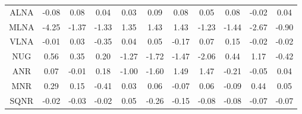 \documentclass[11pt,a4paper]{report}
\begin{document}
\begin{longtable}{ | c || c | c | c | c | c | c | c | c | c || c |}
ALNA &  \cellcolor[HTML]{FFFFFF} -0.08 &  \cellcolor[HTML]{FFFFFF} 0.08 &  \cellcolor[HTML]{FFFFFF} 0.04 &  \cellcolor[HTML]{FFFFFF} 0.03 &  \cellcolor[HTML]{FFFFFF} 0.09 &  \cellcolor[HTML]{FFFFFF} 0.08 &  \cellcolor[HTML]{FFFFFF} 0.05 &  \cellcolor[HTML]{FFFFFF} 0.08 &  \cellcolor[HTML]{FFFFFF} -0.02 &  \cellcolor[HTML]{FFFFFF} 0.04 \\
MLNA &  \cellcolor[HTML]{FF9797} -4.25 &  \cellcolor[HTML]{FFDFDF} -1.37 &  \cellcolor[HTML]{FFDFDF} -1.33 &  \cellcolor[HTML]{DFDFFF} 1.35 &  \cellcolor[HTML]{DFDFFF} 1.43 &  \cellcolor[HTML]{DFDFFF} 1.43 &  \cellcolor[HTML]{FFDFDF} -1.23 &  \cellcolor[HTML]{FFD7D7} -1.44 &  \cellcolor[HTML]{FFBFBF} -2.67 &  \cellcolor[HTML]{FFE7E7} -0.90 \\
VLNA &  \cellcolor[HTML]{FFFFFF} -0.01 &  \cellcolor[HTML]{FFFFFF} 0.03 &  \cellcolor[HTML]{FFF7F7} -0.35 &  \cellcolor[HTML]{FFFFFF} 0.04 &  \cellcolor[HTML]{FFFFFF} 0.05 &  \cellcolor[HTML]{FFF7F7} -0.17 &  \cellcolor[HTML]{FFFFFF} 0.07 &  \cellcolor[HTML]{FFFFFF} 0.15 &  \cellcolor[HTML]{FFFFFF} -0.02 &  \cellcolor[HTML]{FFFFFF} -0.02 \\
NUG &  \cellcolor[HTML]{EFEFFF} 0.56 &  \cellcolor[HTML]{F7F7FF} 0.35 &  \cellcolor[HTML]{F7F7FF} 0.20 &  \cellcolor[HTML]{FFDFDF} -1.27 &  \cellcolor[HTML]{FFD7D7} -1.72 &  \cellcolor[HTML]{FFD7D7} -1.47 &  \cellcolor[HTML]{FFCFCF} -2.06 &  \cellcolor[HTML]{F7F7FF} 0.44 &  \cellcolor[HTML]{DFDFFF} 1.17 &  \cellcolor[HTML]{FFF7F7} -0.42 \\
ANR &  \cellcolor[HTML]{FFFFFF} 0.07 &  \cellcolor[HTML]{FFFFFF} -0.01 &  \cellcolor[HTML]{F7F7FF} 0.18 &  \cellcolor[HTML]{FFE7E7} -1.00 &  \cellcolor[HTML]{FFD7D7} -1.60 &  \cellcolor[HTML]{D7D7FF} 1.49 &  \cellcolor[HTML]{D7D7FF} 1.47 &  \cellcolor[HTML]{FFF7F7} -0.21 &  \cellcolor[HTML]{FFFFFF} -0.05 &  \cellcolor[HTML]{FFFFFF} 0.04 \\
MNR &  \cellcolor[HTML]{F7F7FF} 0.29 &  \cellcolor[HTML]{FFFFFF} 0.15 &  \cellcolor[HTML]{FFF7F7} -0.41 &  \cellcolor[HTML]{FFFFFF} 0.03 &  \cellcolor[HTML]{FFFFFF} 0.06 &  \cellcolor[HTML]{FFFFFF} -0.07 &  \cellcolor[HTML]{FFFFFF} 0.06 &  \cellcolor[HTML]{FFFFFF} -0.09 &  \cellcolor[HTML]{F7F7FF} 0.44 &  \cellcolor[HTML]{FFFFFF} 0.05 \\
SQNR &  \cellcolor[HTML]{FFFFFF} -0.02 &  \cellcolor[HTML]{FFFFFF} -0.03 &  \cellcolor[HTML]{FFFFFF} -0.02 &  \cellcolor[HTML]{FFFFFF} 0.05 &  \cellcolor[HTML]{FFF7F7} -0.26 &  \cellcolor[HTML]{FFFFFF} -0.15 &  \cellcolor[HTML]{FFFFFF} -0.08 &  \cellcolor[HTML]{FFFFFF} -0.08 &  \cellcolor[HTML]{FFFFFF} -0.07 &  \cellcolor[HTML]{FFFFFF} -0.07 \\

\end{longtable}
\end{document}
